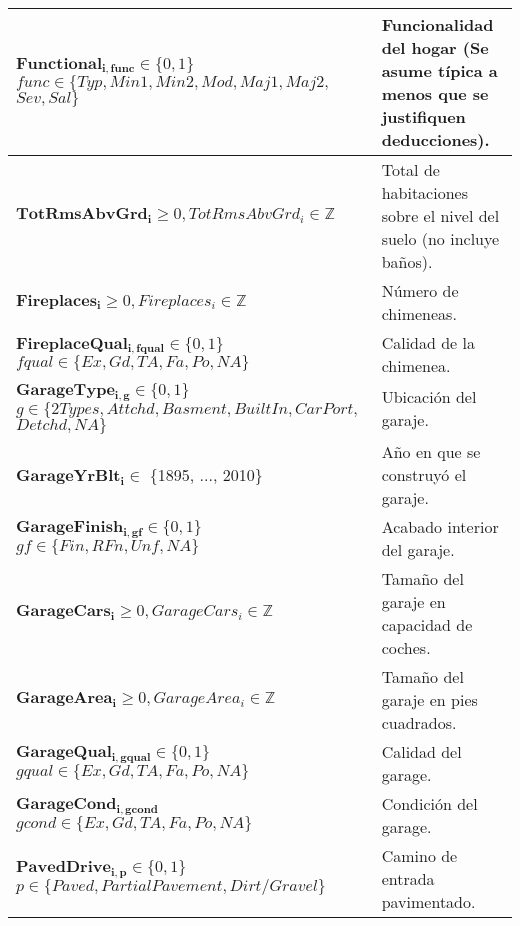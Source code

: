 \begin{longtable}{ | p{8cm} | p{5cm} | }
    \hline
    $\boldsymbol{Functional_{i,func}} \in \{0, 1\}$ \newline $func \in \{Typ, Min1, Min2, Mod, Maj1, Maj2, $\newline$Sev, Sal\}$ & Funcionalidad del hogar (Se asume típica a menos que se justifiquen deducciones).\\
    \hline
    $\boldsymbol{TotRmsAbvGrd_{i}} \geq 0, TotRmsAbvGrd_{i} \in \mathbb{Z}$ & Total de habitaciones sobre el nivel del suelo (no incluye baños).\\
    \hline
    $\boldsymbol{Fireplaces_{i}} \geq 0, Fireplaces_{i} \in \mathbb{Z}$ & Número de chimeneas.\\
    \hline
    $\boldsymbol{FireplaceQual_{i,fqual}} \in \{0, 1\}$ \newline $fqual \in \{Ex, Gd, TA, Fa, Po, NA\}$ & Calidad de la chimenea.\\
    \hline
    $\boldsymbol{GarageType_{i,g}} \in \{0, 1\}$\newline 
    $g \in \{2Types, Attchd, Basment, BuiltIn, CarPort,$\newline 
    \hspace{1cm}$Detchd, NA\}$ & Ubicación del garaje.\\
    \hline
    $\boldsymbol{GarageYrBlt_{i}} \in $ \{1895, ..., 2010\}& Año en que se construyó el garaje.\\
    \hline
    $\boldsymbol{GarageFinish_{i,gf}} \in \{0, 1\}$\newline $gf \in \{Fin, RFn, Unf, NA\}$ & Acabado interior del garaje.\\
    \hline
    $\boldsymbol{GarageCars_{i}} \geq 0, GarageCars_{i} \in \mathbb{Z}$ & Tamaño del garaje en capacidad de coches.\\
    \hline
    $\boldsymbol{GarageArea_{i}} \geq 0, GarageArea_{i} \in \mathbb{Z}$ & Tamaño del garaje en pies cuadrados.\\
    \hline
    $\boldsymbol{GarageQual_{i,gqual}} \in \{0, 1\}$ \newline $gqual \in \{Ex, Gd, TA, Fa, Po, NA\}$ & Calidad del garage.\\
    \hline
    $\boldsymbol{GarageCond_{i,gcond}}$\newline $gcond \in \{Ex, Gd, TA, Fa, Po, NA\}$ & Condición del garage.\\
    \hline
    $\boldsymbol{PavedDrive_{i,p}} \in \{0, 1\}$\newline 
    $p \in \{Paved, Partial Pavement, Dirt/Gravel\}$ & Camino de entrada pavimentado.\\

\end{longtable}
